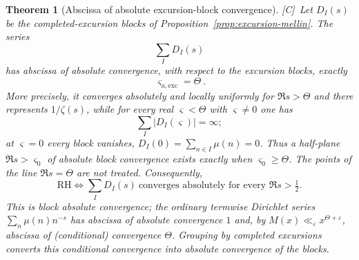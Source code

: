 \documentclass[11pt]{amsart}
\numberwithin{equation}{section}
\theoremstyle{plain}
\newtheorem{theorem}{Theorem}[section]
\theoremstyle{definition}
\theoremstyle{remark}
\newcommand{\eps}{\varepsilon}
\newcommand{\tagC}{\textup{[C]}}
\begin{document}
\begin{theorem}[Abscissa of absolute excursion-block convergence]
\label{thm:excursion-block-abscissa}
\tagC\ Let $D_I(s)$ be the completed-excursion blocks of
Proposition~\ref{prop:excursion-mellin}.  The series
\[
 \sum_I D_I(s)
\]
has abscissa of absolute convergence, with respect to the excursion blocks,
exactly
\[
 \boxed{\ \varsigma_{a,\mathrm{exc}}=\Theta\ }.
\]
More precisely, it converges absolutely and locally uniformly for
$\Re s>\Theta$ and there represents $1/\zeta(s)$, while for every real
$\varsigma<\Theta$ with $\varsigma\ne0$ one has
\[
 \sum_I|D_I(\varsigma)|=\infty ;
\]
at $\varsigma=0$ every block vanishes, $D_I(0)=\sum_{n\in I}\mu(n)=0$.
Thus a half-plane $\Re s>\varsigma_0$ of absolute block convergence exists
exactly when $\varsigma_0\ge\Theta$. The points of the line $\Re s=\Theta$
are not treated.
Consequently,
\[
 \mathrm{RH}\iff
 \sum_I D_I(s)\ \text{converges absolutely for every }\Re s>\tfrac12.
\]
This is block absolute convergence; the ordinary termwise Dirichlet series
$\sum_n\mu(n)n^{-s}$ has abscissa of absolute convergence $1$ and, by
$M(x)\ll_\eps x^{\Theta+\eps}$, abscissa of (conditional) convergence
$\Theta$. Grouping by completed excursions converts this conditional
convergence into absolute convergence of the blocks.
\end{theorem}
\end{document}
